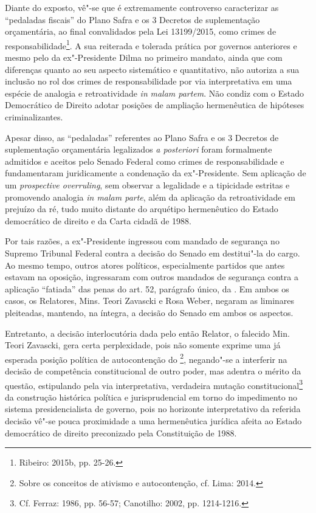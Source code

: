 Diante do exposto, vê"-se que é extremamente controverso caracterizar as
``pedaladas fiscais'' do Plano Safra e os 3 Decretos de suplementação
orçamentária, ao final convalidados pela Lei 13199/2015, como crimes de
responsabilidade\footnote{Ribeiro: 2015b, pp. 25-26.}. A sua reiterada e tolerada
prática por governos anteriores e mesmo pelo da ex"-Presidente Dilma no
primeiro mandato, ainda que com diferenças quanto ao seu aspecto
sistemático e quantitativo, não autoriza a sua inclusão no rol dos
crimes de responsabilidade por via interpretativa em uma espécie de
analogia e retroatividade \emph{in} \emph{malam partem}. Não condiz com
o Estado Democrático de Direito adotar posições de ampliação
hermenêutica de hipóteses criminalizantes.

Apesar disso, as ``pedaladas'' referentes ao Plano Safra e os 3 Decretos
de suplementação orçamentária legalizados \emph{a posteriori} foram
formalmente admitidos e aceitos pelo Senado Federal como crimes de
responsabilidade e fundamentaram juridicamente a condenação da
ex"-Presidente. Sem aplicação de um \emph{prospective overruling}, sem
observar a legalidade e a tipicidade estritas e promovendo analogia
\emph{in malam parte}, além da aplicação da retroatividade em prejuízo
da ré, tudo muito distante do arquétipo hermenêutico do Estado
democrático de direito e da Carta cidadã de 1988.

Por tais razões, a ex"-Presidente ingressou com mandado de segurança no
Supremo Tribunal Federal contra a decisão do Senado em destitui"-la do
cargo. Ao mesmo tempo, outros atores políticos, especialmente partidos
que antes estavam na oposição, ingressaram com outros mandados de
segurança contra a aplicação ``fatiada'' das penas do art. 52, parágrafo
único, da . Em ambos os casos, os Relatores, Mins. Teori Zavascki e
Rosa Weber, negaram as liminares pleiteadas, mantendo, na íntegra, a
decisão do Senado em ambos os aspectos.

Entretanto, a decisão interlocutória dada pelo então Relator, o falecido
Min. Teori Zavascki, gera certa perplexidade, pois não somente exprime
uma já esperada posição política de autocontenção do \footnote{Sobre
  os conceitos de ativismo e autocontenção, cf. Lima: 2014.}, negando"-se
a interferir na decisão de competência constitucional de outro poder,
mas adentra o mérito da questão, estipulando pela via interpretativa,
verdadeira mutação constitucional\footnote{Cf. Ferraz: 1986, pp. 56-57;
Canotilho: 2002, pp. 1214-1216.} da construção histórica política e
jurisprudencial em torno do impedimento no sistema presidencialista de
governo, pois no horizonte interpretativo da referida decisão vê"-se
pouca proximidade a uma hermenêutica jurídica afeita ao Estado
democrático de direito preconizado pela Constituição de 1988.

